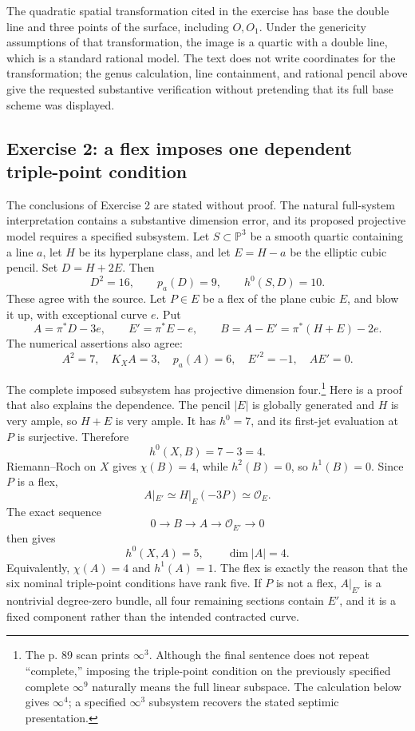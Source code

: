 The quadratic spatial transformation cited in the exercise has base the double line and three points of the surface, including \(O,O_1\). Under the genericity assumptions of that transformation, the image is a quartic with a double line, which is a standard rational model. The text does not write coordinates for the transformation; the genus calculation, line containment, and rational pencil above give the requested substantive verification without pretending that its full base scheme was displayed.

\subsection{Exercise 2: a flex imposes one dependent triple-point condition}

The conclusions of Exercise 2 are stated without proof. The natural full-system interpretation contains a substantive dimension error, and its proposed projective model requires a specified subsystem. Let \(S\subset\mathbb{P}^3\) be a smooth quartic containing a line \(a\), let \(H\) be its hyperplane class, and let \(E=H-a\) be the elliptic cubic pencil. Set \(D=H+2E\). Then \[
D^2=16,\qquad p_a(D)=9,\qquad h^0(S,D)=10.
\] These agree with the source. Let \(P\in E\) be a flex of the plane cubic \(E\), and blow it up, with exceptional curve \(e\). Put \[
A=\pi^*D-3e,\qquad E'=\pi^*E-e,\qquad
B=A-E'=\pi^*(H+E)-2e.
\] The numerical assertions also agree: \[
A^2=7,\quad K_XA=3,\quad p_a(A)=6,\quad
E'^2=-1,\quad AE'=0.
\tag{III.9}
\]

The complete imposed subsystem has projective dimension four.\footnote{The p. 89 scan prints \(\infty^3\). Although the final sentence does not repeat ``complete,'' imposing the triple-point condition on the previously specified complete \(\infty^9\) naturally means the full linear subspace. The calculation below gives \(\infty^4\); a specified \(\infty^3\) subsystem recovers the stated septimic presentation.} Here is a proof that also explains the dependence. The pencil \(|E|\) is globally generated and \(H\) is very ample, so \(H+E\) is very ample. It has \(h^0=7\), and its first-jet evaluation at \(P\) is surjective. Therefore \[
h^0(X,B)=7-3=4.
\] Riemann--Roch on \(X\) gives \(\chi(B)=4\), while \(h^2(B)=0\), so \(h^1(B)=0\). Since \(P\) is a flex, \[
A|_{E'}\simeq H|_E(-3P)\simeq\mathcal O_E.
\] The exact sequence \[
0\to B\to A\to\mathcal O_{E'}\to0
\] then gives \[
h^0(X,A)=5,\qquad \dim|A|=4.
\tag{III.10}
\] Equivalently, \(\chi(A)=4\) and \(h^1(A)=1\). The flex is exactly the reason that the six nominal triple-point conditions have rank five. If \(P\) is not a flex, \(A|_{E'}\) is a nontrivial degree-zero bundle, all four remaining sections contain \(E'\), and it is a fixed component rather than the intended contracted curve.

